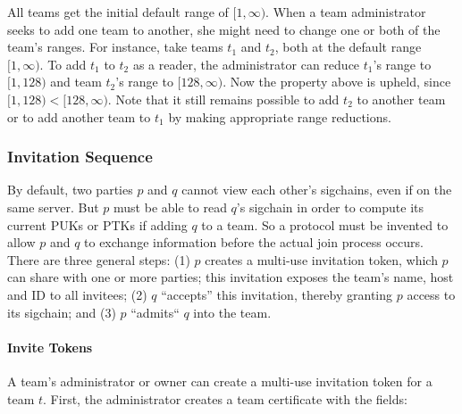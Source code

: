 All teams get the initial default range of $[1,\infty)$. When a team administrator
seeks to add one team to another, she might need to change one or both of the team's
ranges. For instance, take teams $t_1$ and $t_2$, both at the default range $[1,\infty)$.
To add $t_1$ to $t_2$ as a reader, the administrator can reduce $t_1$'s range to $[1, 128)$
and team $t_2$'s range to $[128, \infty)$. Now the property above is upheld,
since $[1,128) < [128, \infty)$.  Note that it still remains possible to add $t_2$ to 
another team or to add another team to $t_1$ by making appropriate range reductions.

\subsubsection{Invitation Sequence}
\label{sec:invitation}

By default, two parties $p$ and $q$ cannot view each other's sigchains, even if on the same
server. But $p$ must be able to read $q$'s sigchain in order to compute its current
PUKs or PTKs if adding $q$ to a team. So a protocol must be invented to allow $p$ and $q$
to exchange information before the actual join process occurs. There are three general
steps: (1) $p$ creates a multi-use invitation token, which $p$ can share with one or
more parties; this invitation exposes the team's name, host and ID to all invitees; 
(2) $q$ ``accepts'' this invitation, thereby granting $p$ access to its sigchain;
and (3) $p$ ``admits`` $q$ into the team.

\paragraph{Invite Tokens}

A team's administrator or owner can create a multi-use invitation token for a team $t$.
First, the administrator creates a team certificate with the fields:

